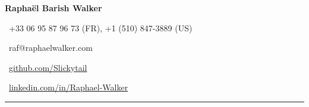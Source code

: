 \documentclass[12pt,letterpaper]{article}
\begin{document}

{\LARGE{\textbf{Raphaël Barish Walker}}}\vspace{7pt}

\faPhone \, +33 06 95 87 96 73 (FR), +1 (510) 847-3889 (US)\vspace{4pt}

\faEnvelope \, raf@raphaelwalker.com\vspace{4pt}

\faGithub \, \href{https://github.com/Slickytail}{github.com/Slickytail}\vspace{4pt}

\faLinkedinSquare \, \href{https://linkedin.com/in/raphael-walker}{linkedin.com/in/Raphael-Walker}\vspace{4pt}


\hrule
\end{document}
